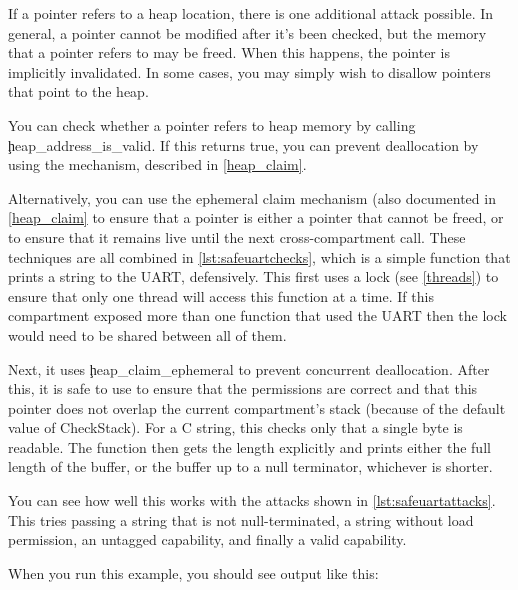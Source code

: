 If a pointer refers to a heap location, there is one additional attack possible.
In general, a pointer cannot be modified after it's been checked, but the memory that a pointer refers to may be freed.
When this happens, the pointer is implicitly invalidated.
In some cases, you may simply wish to disallow pointers that point to the heap.

You can check whether a pointer refers to heap memory by calling \c{heap_address_is_valid}.
If this returns true, you can prevent deallocation by using the  mechanism, described in \ref{heap_claim}.


Alternatively, you can use the ephemeral claim mechanism (also documented in \ref{heap_claim} to ensure that a pointer is either a pointer that cannot be freed, or to ensure that it remains live until the next cross-compartment call.
These techniques are all combined in \ref{lst:safeuartchecks}, which is a simple function that prints a string to the UART, defensively.
This first uses a lock (see \ref{threads}) to ensure that only one thread will access this function at a time.
If this compartment exposed more than one function that used the UART then the lock would need to be shared between all of them.

\codelisting[marker=safe_uart,caption=Checks to ensure that a function does not crash.,label=lst:safeuartchecks, filename=examples/check_arguments/uart.cc]{}

Next, it uses \c{heap_claim_ephemeral} to prevent concurrent deallocation.
After this, it is safe to use  to ensure that the permissions are correct and that this pointer does not overlap the current compartment's stack (because of the default value of CheckStack).
For a C string, this checks only that a single byte is readable.
The function then gets the length explicitly and prints either the full length of the buffer, or the buffer up to a null terminator, whichever is shorter.


You can see how well this works with the attacks shown in \ref{lst:safeuartattacks}.
This tries passing a string that is not null-terminated, a string without load permission, an untagged capability, and finally a valid capability.

\codelisting[marker=attacks,caption=Attempting to attack the safe UART.,label=lst:safeuartattacks, filename=examples/check_arguments/hello.cc]{}

When you run this example, you should see output like this:

